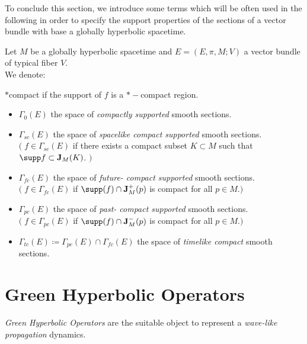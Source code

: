 \documentclass[Main]{subfiles}
\begin{document}
			To conclude this section, we introduce some terms which will be often used in the following in order to
specify the support properties of the sections of a vector bundle with base a globally hyperbolic spacetime.
			\begin{notationfix}

				Let $M$ be a globally hyperbolic spacetime and $E=(E,\pi,M;V)$ a vector bundle of typical fiber $V$.\\
				We denote:
				\ifToninus
					\begin{Warning}
					$*$compact if the support of $f$ is a $*-$compact region.
					\end{Warning}
				\fi
				\begin{itemize}
							\renewcommand\labelitemi{$\cdot$}
					\item $\Gamma_0(E)$ the space of \emph{compactly supported} smooth sections.
					\item $\Gamma_{sc}(E)$  the space of \emph{spacelike compact supported} smooth sections.\\
						$\big(\; f\in \Gamma_{sc}(E)$ if there exists a compact subset $K \subset M$  such that $\supp f \subset \mathbf{J}_M(K)$. $\big)$
					\item  $\Gamma_{fc}(E) $ the space of \emph{future- compact supported} smooth sections.\\
						$\big(\; f\in \Gamma_{fc}(E) $ if  $\supp(f) \cap  \mathbf{J}^+_M(p)$ is compact for all $p\in M$.$\big)$
					\item  $\Gamma_{pc}(E) $ the space of \emph{past- compact supported} smooth sections.\\
						$\big(\; f\in \Gamma_{pc}(E) $ if  $\supp(f) \cap  \mathbf{J}^-_M(p)$ is compact for all $p\in M$.$\big)$
					\item $\Gamma_{tc}(E) \coloneqq \Gamma_{pc}(E) \cap \Gamma_{fc}(E) $ the space of \emph{timelike compact} smooth sections.
				\end{itemize}
			\end{notationfix}




		\section{Green Hyperbolic Operators}
					\emph{Green Hyperbolic Operators} are the suitable object to represent a \emph{wave-like propagation} dynamics.
\end{document}
